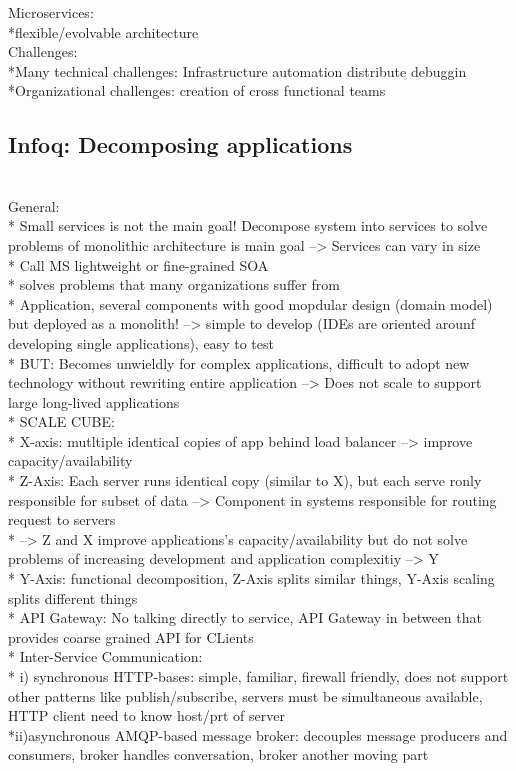 Microservices:\\
*flexible/evolvable architecture\\


Challenges:\\
*Many technical challenges: Infrastructure automation distribute debuggin\\
*Organizational challenges: creation of cross functional teams\\


\subsection{Infoq: Decomposing applications}
\cite{infoq} \\


General: \\
* Small services is not the main goal! Decompose system  into services to solve problems of monolithic architecture is main goal --> Services can vary in size\\
* Call MS lightweight or fine-grained SOA\\
* solves problems that many organizations suffer from\\
* Application, several components with good mopdular design (domain model) but deployed as a monolith! --> simple to develop (IDEs are oriented arounf developing single applications), easy to test\\
* BUT: Becomes  unwieldly for complex applications, difficult to adopt new technology without rewriting entire application --> Does not scale to support large long-lived applications\\
* SCALE CUBE: \\
* X-axis: mutltiple identical copies of app behind load balancer --> improve capacity/availability\\
* Z-Axis: Each server runs identical copy (similar to X), but each serve ronly responsible for subset of data --> Component in systems responsible for routing request to servers\\
* --> Z and X improve applications's capacity/availability but do not solve problems of increasing development and application complexitiy --> Y\\
* Y-Axis: functional decomposition, Z-Axis splits similar things, Y-Axis scaling splits different things\\
* API Gateway: No talking directly to service, API Gateway in between that provides coarse grained API for CLients\\
* Inter-Service Communication:\\
* i) synchronous HTTP-bases: simple, familiar, firewall friendly, does not support other patterns like publish/subscribe, servers must be simultaneous available, HTTP client need to know host/prt of server\\
*ii)asynchronous AMQP-based message broker: decouples message producers and consumers, broker handles conversation, broker another moving part\\


